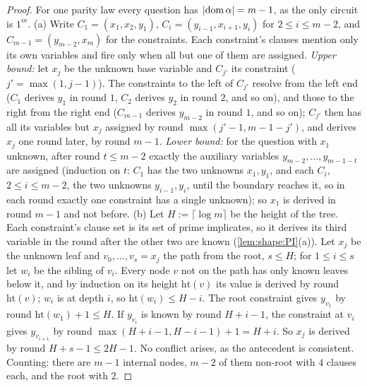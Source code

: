 \begin{proof}
For one parity law every question has $\lvert\operatorname{dom}\alpha\rvert=m-1$, as the only circuit is $1^m$.
(a) Write $C_1=(x_1,x_2,y_1)$, $C_i=(y_{i-1},x_{i+1},y_i)$ for $2\le i\le m-2$, and $C_{m-1}=(y_{m-2},x_m)$ for the constraints. Each constraint's clauses mention only its own variables and fire only when all but one of them are assigned. \emph{Upper bound:} let $x_j$ be the unknown base variable and $C_{j'}$ its constraint ($j'=\max(1,j-1)$). The constraints to the left of $C_{j'}$ resolve from the left end ($C_1$ derives $y_1$ in round $1$, $C_2$ derives $y_2$ in round $2$, and so on), and those to the right from the right end ($C_{m-1}$ derives $y_{m-2}$ in round $1$, and so on); $C_{j'}$ then has all its variables but $x_j$ assigned by round $\max(j'-1,m-1-j')$, and derives $x_j$ one round later, by round $m-1$. \emph{Lower bound:} for the question with $x_1$ unknown, after round $t\le m-2$ exactly the auxiliary variables $y_{m-2},\dots,y_{m-1-t}$ are assigned (induction on $t$: $C_1$ has the two unknowns $x_1,y_1$, and each $C_i$, $2\le i\le m-2$, the two unknowns $y_{i-1},y_i$, until the boundary reaches it, so in each round exactly one constraint has a single unknown); so $x_1$ is derived in round $m-1$ and not before.
(b) Let $H:=\lceil\log m\rceil$ be the height of the tree. Each constraint's clause set is its set of prime implicates, so it derives its third variable in the round after the other two are known (\cref{lem:shape:PI}(a)). Let $x_j$ be the unknown leaf and $v_0,\dots,v_s=x_j$ the path from the root, $s\le H$; for $1\le i\le s$ let $w_i$ be the sibling of $v_i$. Every node $v$ not on the path has only known leaves below it, and by induction on its height $\mathrm{ht}(v)$ its value is derived by round $\mathrm{ht}(v)$; $w_i$ is at depth $i$, so $\mathrm{ht}(w_i)\le H-i$. The root constraint gives $y_{v_1}$ by round $\mathrm{ht}(w_1)+1\le H$. If $y_{v_i}$ is known by round $H+i-1$, the constraint at $v_i$ gives $y_{v_{i+1}}$ by round $\max(H+i-1,H-i-1)+1=H+i$. So $x_j$ is derived by round $H+s-1\le2H-1$. No conflict arises, as the antecedent is consistent. Counting: there are $m-1$ internal nodes, $m-2$ of them non-root with $4$ clauses each, and the root with $2$.

\end{proof}
